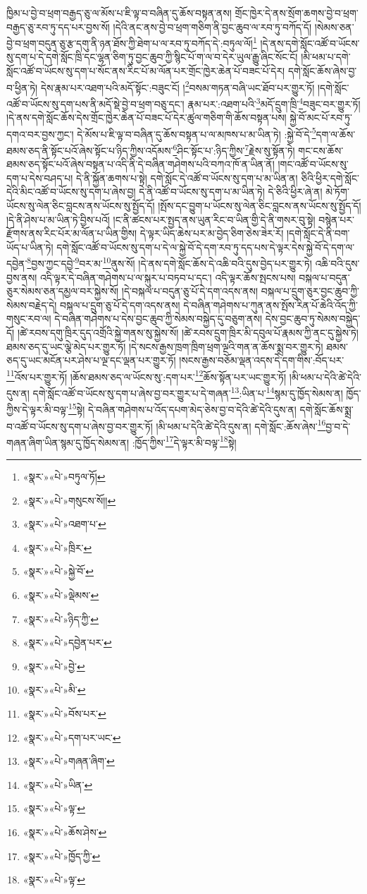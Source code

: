 ཁྱིམ་པ་བྱེ་བ་ཕྲག་བརྒྱད་ཅུ་ལ་མོས་པ་ཇི་ལྟ་བ་བཞིན་དུ་ཆོས་བསྟན་ནས། གྲོང་ཁྱེར་དེ་ནས་སྲོག་ཆགས་བྱེ་བ་ཕྲག་བརྒྱད་ཅུ་རབ་ཏུ་དད་པར་བྱས་སོ། །དེའི་ནང་ནས་བྱེ་བ་ཕྲག་གཅིག་ནི་བྱང་ཆུབ་ལ་རབ་ཏུ་བཀོད་དོ། །སེམས་ཅན་བྱེ་བ་ཕྲག་བདུན་ཅུ་རྩ་དགུ་ནི་ཉན་ཐོས་ཀྱི་ཐེག་པ་ལ་རབ་ཏུ་བཀོད་དེ་:བཏུལ་ལོ།\footnote{«སྣར་»«པེ་»བཏུལ་ཏོ།} །དེ་ནས་དགེ་སློང་འཚོ་བ་ཡོངས་སུ་དག་པ་དེ་དགེ་སློང་ཁྲི་དང་ལྷན་ཅིག་ཏུ་བྱང་ཆུབ་ཀྱི་སྙིང་པོ་ག་ལ་བ་དེར་ཡུལ་རྒྱུ་ཞིང་སོང་ངོ། །མི་ཕམ་པ་དགེ་སློང་འཚོ་བ་ཡོངས་སུ་དག་པ་སོང་ནས་རིང་པོ་མ་ལོན་པར་གྲོང་ཁྱེར་ཆེན་པོ་བཟང་པོ་དེར། དགེ་སློང་ཆོས་ཞེས་བྱ་བ་ཕྱིན་ཏེ། དེས་རྣམ་པར་འཐག་པའི་མདོ་སྟོང་:བཟུང་ངོ། །\footnote{«སྣར་»«པེ་»གསུངས་སོ།།}བསམ་གཏན་བཞི་ཡང་ཐོབ་པར་གྱུར་ཏོ། །དགེ་སློང་འཚོ་བ་ཡོངས་སུ་དག་པས་ནི་མདོ་སྡེ་བྱེ་བ་ཕྲག་བཅུ་དང་། རྣམ་པར་:འཐག་པའི་\footnote{«སྣར་»«པེ་»འཐག་པ་}མདོ་དྲུག་ཁྲི་\footnote{«སྣར་»«པེ་»ཁྲིར་}བཟུང་བར་གྱུར་ཏོ། །དེ་ནས་དགེ་སློང་ཆོས་དེས་གྲོང་ཁྱེར་ཆེན་པོ་བཟང་པོ་དེར་ཚུལ་གཅིག་གི་ཆོས་བསྟན་པས། སྐྱེ་བོ་མང་པོ་རབ་ཏུ་དགའ་བར་བྱས་ཀྱང་། དེ་མོས་པ་ཇི་ལྟ་བ་བཞིན་དུ་ཆོས་བསྟན་པ་ལ་མཁས་པ་མ་ཡིན་ཏེ། :སྐྱེ་བོ་དེ་\footnote{«སྣར་»«པེ་»སྐྱེ་བོ་}དག་ལ་ཆོས་ཐམས་ཅད་ནི་སྟོང་པའོ་ཞེས་སྟོང་པ་ཉིད་ཀྱིས་འདོམས་\footnote{«སྣར་»«པེ་»ལྡེམས་}ཤིང་སྟོང་པ་:ཉིད་ཀྱིས་\footnote{«སྣར་»«པེ་»ཉིད་ཀྱི་}རྗེས་སུ་སྟོན་ཏེ། གང་ངས་ཆོས་ཐམས་ཅད་སྟོང་པའོ་ཞེས་བསྟན་པ་འདི་ནི་དེ་བཞིན་གཤེགས་པའི་བཀའ་ཁོ་ན་ཡིན་ནོ། །གང་འཚོ་བ་ཡོངས་སུ་དག་པ་དེས་བཤད་པ། དེ་ནི་སྐྱོན་ཆགས་པ་སྟེ། དགེ་སློང་དེ་འཚོ་བ་ཡོངས་སུ་དག་པ་མ་ཡིན་ན། ཅིའི་ཕྱིར་དགེ་སློང་དེའི་མིང་འཚོ་བ་ཡོངས་སུ་དག་པ་ཞེས་བྱ། དེ་ནི་འཚོ་བ་ཡོངས་སུ་དག་པ་མ་ཡིན་ཏེ། དེ་ཅིའི་ཕྱིར་ཞེ་ན། མེ་ཏོག་ཡོངས་སུ་ལེན་ཅིང་བླངས་ནས་ཡོངས་སུ་སྤྱོད་དོ། །སྤོས་དང་བྱུག་པ་ཡོངས་སུ་ལེན་ཅིང་བླངས་ནས་ཡོངས་སུ་སྤྱོད་དོ། །དེ་ནི་ཤེས་པ་མ་ཡིན་ཏེ་བྱིས་པའོ། །ང་ནི་ཚངས་པར་སྤྱད་ནས་ཡུན་རིང་བ་ཡིན་གྱི་དེ་ནི་གསར་བུ་སྟེ། བསྙེན་པར་རྫོགས་ནས་རིང་པོར་མ་ལོན་པ་ཡིན་གྱིས། དེ་ལྟར་ཡིད་ཆེས་པར་མ་བྱེད་ཅིག་ཅེས་ཟེར་རོ། །དགེ་སློང་དེ་ནི་བག་ཡོད་པ་ཡིན་ཏེ། དགེ་སློང་འཚོ་བ་ཡོངས་སུ་དག་པ་དེ་ལ་སྐྱེ་བོ་དེ་དག་རབ་ཏུ་དད་པས་དེ་ལྟར་དེས་སྐྱེ་བོ་དེ་དག་ལ་དབྱེན་\footnote{«སྣར་»«པེ་»དབྱེན་པར་}བྱས་ཀྱང་དབྱེ་\footnote{«སྣར་»«པེ་»བྱེ་}བར་མ་\footnote{«སྣར་»«པེ་»མི་}ནུས་སོ། །དེ་ནས་དགེ་སློང་ཆོས་དེ་འཆི་བའི་དུས་བྱེད་པར་གྱུར་ཏེ། འཆི་བའི་དུས་བྱས་ནས། འདི་ལྟར་དེ་བཞིན་གཤེགས་པ་ལ་སྐུར་པ་བཏབ་པ་དང་། འདི་ལྟར་ཆོས་སྤངས་པས། བསྐལ་པ་བདུན་ཅུར་སེམས་ཅན་དམྱལ་བར་སྐྱེས་སོ། །དེ་བསྐལ་པ་བདུན་ཅུ་པོ་དེ་དག་འདས་ནས། བསྐལ་པ་དྲུག་ཅུར་བྱང་ཆུབ་ཀྱི་སེམས་བརྗེད་དེ། བསྐལ་པ་དྲུག་ཅུ་པོ་དེ་དག་འདས་ནས། དེ་བཞིན་གཤེགས་པ་ཀུན་ནས་སྤོས་རིན་པོ་ཆེའི་འོད་ཀྱི་གསུང་རབ་ལ། དེ་བཞིན་གཤེགས་པ་དེས་བྱང་ཆུབ་ཀྱི་སེམས་བསྐྱེད་དུ་བཅུག་ནས། དེས་བྱང་ཆུབ་ཏུ་སེམས་བསྐྱེད་དོ། །ཚེ་རབས་དགུ་ཁྲིར་དུད་འགྲོའི་སྐྱེ་གནས་སུ་སྐྱེས་སོ། །ཚེ་རབས་དྲུག་ཁྲིར་མི་དབུལ་པོ་རྣམས་ཀྱི་ནང་དུ་སྐྱེས་ཏེ། ཐམས་ཅད་དུ་ཡང་ལྕེ་མེད་པར་གྱུར་ཏོ། །དེ་སངས་རྒྱས་ཁྲག་ཁྲིག་ཕྲག་ལྔའི་གན་ན་ཆོས་སྨྲ་བར་གྱུར་ཏེ། ཐམས་ཅད་དུ་ཡང་མངོན་པར་ཤེས་པ་ལྔ་དང་ལྡན་པར་གྱུར་ཏོ། །སངས་རྒྱས་བཅོམ་ལྡན་འདས་དེ་དག་གིས་:བོད་པར་\footnote{«སྣར་»«པེ་»བོས་པར་}འོས་པར་གྱུར་ཏོ། །ཆོས་ཐམས་ཅད་ལ་ཡོངས་སུ་:དག་པར་\footnote{«སྣར་»«པེ་»དག་པར་ཡང་}ཆོས་སྟོན་པར་ཡང་གྱུར་ཏོ། །མི་ཕམ་པ་དེའི་ཚེ་དེའི་དུས་ན། དགེ་སློང་འཚོ་བ་ཡོངས་སུ་དག་པ་ཞེས་བྱ་བར་གྱུར་པ་དེ་གཞན་\footnote{«སྣར་»«པེ་»གཞན་ཞིག་}:ཡིན་པ་\footnote{«སྣར་»«པེ་»ཡིན་}སྙམ་དུ་ཁྱོད་སེམས་ན། ཁྱོད་ཀྱིས་དེ་ལྟར་མི་བལྟ་\footnote{«སྣར་»«པེ་»ལྟ་}སྟེ། དེ་བཞིན་གཤེགས་པ་འོད་དཔག་མེད་ཅེས་བྱ་བ་དེའི་ཚེ་དེའི་དུས་ན། དགེ་སློང་ཆོས་སྨྲ་བ་འཚོ་བ་ཡོངས་སུ་དག་པ་ཞེས་བྱ་བར་གྱུར་ཏོ། །མི་ཕམ་པ་དེའི་ཚེ་དེའི་དུས་ན། དགེ་སློང་:ཆོས་ཞེས་\footnote{«སྣར་»«པེ་»ཆོས་ཤེས་}བྱ་བ་དེ་གཞན་ཞིག་ཡིན་སྙམ་དུ་ཁྱོད་སེམས་ན། :ཁྱོད་ཀྱིས་\footnote{«སྣར་»«པེ་»ཁྱོད་ཀྱི་}དེ་ལྟར་མི་བལྟ་\footnote{«སྣར་»«པེ་»ལྟ་}སྟེ། 